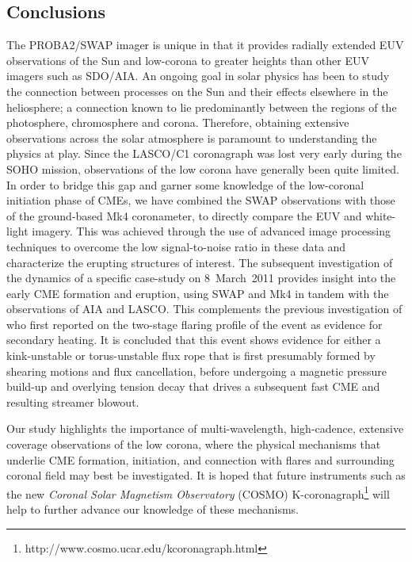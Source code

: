 \documentclass[namedreferences]{solarphysics}
\begin{document}
\begin{article}
\section{Conclusions}
\label{sect:conclusions}

The PROBA2/SWAP imager is unique in that it provides radially extended EUV observations of the Sun and low-corona to greater heights than other EUV imagers such as SDO/AIA. An ongoing goal in solar physics has been to study the connection between processes on the Sun and their effects elsewhere in the heliosphere; a connection known to lie predominantly between the regions of the photosphere, chromosphere and corona. Therefore, obtaining extensive observations across the solar atmosphere is paramount to understanding the physics at play. Since the LASCO/C1 coronagraph was lost very early during the SOHO mission, observations of the low corona have generally been quite limited. In order to bridge this gap and garner some knowledge of the low-coronal initiation phase of CMEs, we have combined the SWAP observations with those of the ground-based Mk4 coronameter, to directly compare the EUV and white-light imagery. This was achieved through the use of advanced image processing techniques to overcome the low signal-to-noise ratio in these data and characterize the erupting structures of interest. The subsequent investigation of the dynamics of a specific case-study on 8~March~2011 provides insight into the early CME formation and eruption, using SWAP and Mk4 in tandem with the observations of AIA and LASCO. This complements the previous investigation of  who first reported on the two-stage flaring profile of the event as evidence for secondary heating. It is concluded that this event shows evidence for either a kink-unstable or torus-unstable flux rope that is first presumably formed by shearing motions and flux cancellation, before undergoing a magnetic pressure build-up and overlying tension decay that drives a subsequent fast CME and resulting streamer blowout. 

Our study highlights the importance of multi-wavelength, high-cadence, extensive coverage observations of the low corona, where the physical mechanisms that underlie CME formation, initiation, and connection with flares and surrounding coronal field may best be investigated. It is hoped that future instruments such as the new \emph{Coronal Solar Magnetism Observatory} (COSMO) K-coronagraph\footnote{http://www.cosmo.ucar.edu/kcoronagraph.html} will help to further advance our knowledge of these mechanisms.




\end{article}
\end{document}
